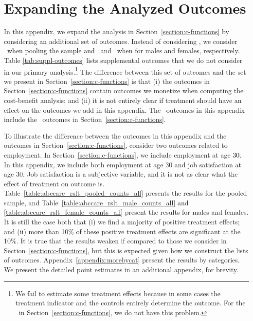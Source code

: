 \section{{Expanding the Analyzed Outcomes}} \label{appendix:moreoutcomes}

\noindent In this appendix, we expand the analysis in Section~\ref{section:c-functions} by considering an additional set of outcomes. Instead of considering \noutcomes, we consider \noutcomesexpp\ when pooling the sample and \noutcomesexpm\ and \noutcomesexpf\ when for males and females, respectively. Table \ref{tab:suppl-outcomes} lists supplemental outcomes that we do not consider in our primary analysis.\footnote{We fail to estimate some treatment effects because in some cases the treatment indicator and the controls entirely determine the outcome. For the \noutcomes\ in Section~\ref{section:c-functions}, we do not have this problem.} The difference between this set of outcomes and the set we present in Section~\ref{section:c-functions} is that (i) the outcomes in Section~\ref{section:c-functions} contain outcomes we monetize when computing the cost-benefit analysis; and (ii) it is not entirely clear if treatment should have an effect on the outcomes we add in this appendix. The \noutcomesexpp\ outcomes in this appendix include the \noutcomes\ outcomes in Section~\ref{section:c-functions}.\\

\singlespacing

\doublespacing

\noindent To illustrate the difference between the outcomes in this appendix and the outcomes in Section~\ref{section:c-functions}, consider two outcomes related to employment. In Section~\ref{section:c-functions}, we include employment at age 30. In this appendix, we include both employment at age 30 and job satisfaction at age 30. Job satisfaction is a subjective variable, and it is not as clear what the effect of treatment on outcome is.\\

\noindent Table~\ref{table:abccare_rslt_pooled_counts_all} presents the results for the pooled sample, and Table~\ref{table:abccare_rslt_male_counts_all} and \ref{table:abccare_rslt_female_counts_all} present the results for males and females. It is still the case both that (i) we find a majority of positive treatment effects; and (ii) more than 10\% of these positive treatment effects are significant at the 10\%. It is true that the results weaken if compared to those we consider in Section~\ref{section:c-functions}, but this is expected given how we construct the lists of outcomes. Appendix~\ref{appendix:morebycat} present the results by categories. We present the detailed point estimates in an additional appendix, for brevity.

